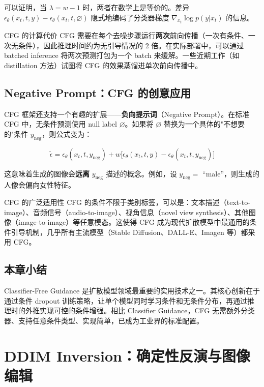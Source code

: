 \documentclass[a4paper]{article}
\begin{document}
可以证明，当 $\lambda = w - 1$ 时，两者在数学上是等价的。差异 $\epsilon_\theta(x_t, t, y) - \epsilon_\theta(x_t, t, \varnothing)$ 隐式地编码了分类器梯度 $\nabla_{x_t}\log p(y|x_t)$ 的信息。

\begin{warningbox}{CFG 的计算代价}
CFG 需要在每个去噪步骤运行\textbf{两次}前向传播（一次有条件、一次无条件），因此推理时间约为无引导情况的 2 倍。在实际部署中，可以通过 batched inference 将两次预测打包为一个 batch 来缓解。一些近期工作（如 distillation 方法）试图将 CFG 的效果蒸馏进单次前向传播中。
\end{warningbox}

\subsection{Negative Prompt：CFG 的创意应用}

CFG 框架还支持一个有趣的扩展——\textbf{负向提示词}（Negative Prompt）。在标准 CFG 中，无条件预测使用 null label $\varnothing$。如果将 $\varnothing$ 替换为一个具体的"不想要的"条件 $y_{\text{neg}}$，则公式变为：

$$
\tilde{\epsilon} = \epsilon_\theta(x_t, t, y_{\text{neg}}) + w\bigl[\epsilon_\theta(x_t, t, y) - \epsilon_\theta(x_t, t, y_{\text{neg}})\bigr]
$$

这意味着生成的图像会\textbf{远离} $y_{\text{neg}}$ 描述的概念。例如，设 $y_{\text{neg}} =$ ``male''，则生成的人像会偏向女性特征。

\begin{knowledgebox}{CFG 的广泛适用性}
CFG 的条件不限于类别标签，可以是：文本描述（text-to-image）、音频信号（audio-to-image）、视角信息（novel view synthesis）、其他图像（image-to-image）等任意模态。这使得 CFG 成为现代扩散模型中最通用的条件引导机制，几乎所有主流模型（Stable Diffusion、DALL-E、Imagen 等）都采用 CFG。
\end{knowledgebox}

\subsection{本章小结}

Classifier-Free Guidance 是扩散模型领域最重要的实用技术之一。其核心创新在于通过条件 dropout 训练策略，让单个模型同时学习条件和无条件分布，再通过推理时的外推实现可控的条件增强。相比 Classifier Guidance，CFG 无需额外分类器、支持任意条件类型、实现简单，已成为工业界的标准配置。

\newpage
\section{DDIM Inversion：确定性反演与图像编辑}
\end{document}
